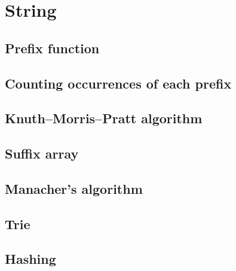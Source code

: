 \section{String}

\subsection{Prefix function}

\subsection{Counting occurrences of each prefix}

\subsection{Knuth–Morris–Pratt algorithm}

\subsection{Suffix array}

\subsection{Manacher's algorithm}

\subsection{Trie}

\subsection{Hashing}
